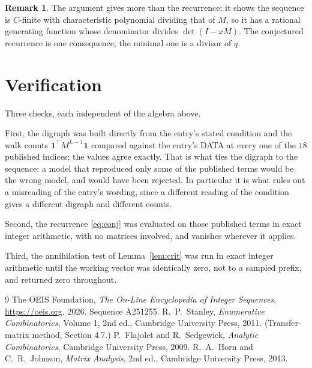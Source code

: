 \documentclass[11pt,a4paper]{article}
\theoremstyle{plain}
\theoremstyle{definition}
\newtheorem{remark}[theorem]{Remark}
\begin{document}
\begin{remark}
The argument gives more than the recurrence: it shows the sequence is $C$-finite with
characteristic polynomial dividing that of $M$, so it has a rational generating function
whose denominator divides $\det(I-xM)$. The conjectured recurrence is one consequence; the
minimal one is a divisor of $q$.
\end{remark}

\section{Verification}

Three checks, each independent of the algebra above.

First, the digraph was built directly from the entry's stated condition and the walk counts
$\mathbf{1}^{\!\top}M^{L-1}\mathbf{1}$ compared against the entry's DATA at
every one of the $18$ published indices; the values agree exactly. That is what ties
the digraph to the sequence: a model that reproduced only some of the published terms would
be the wrong model, and would have been rejected. In particular it is what rules out a
misreading of the entry's wording, since a different reading of the condition gives a
different digraph and different counts.

Second, the recurrence \eqref{eq:conj} was evaluated on those published terms in exact
integer arithmetic, with no matrices involved, and vanishes wherever it applies.

Third, the annihilation test of Lemma~\ref{lem:crit} was run in exact integer arithmetic
until the working vector was identically zero, not to a sampled prefix, and returned zero
throughout.

\begin{thebibliography}{9}
 The OEIS Foundation, \emph{The On-Line Encyclopedia of Integer
Sequences}, \url{https://oeis.org}, 2026. Sequence A251255.
 R.~P.~Stanley, \emph{Enumerative Combinatorics}, Volume 1, 2nd ed.,
Cambridge University Press, 2011. (Transfer-matrix method, Section 4.7.)
 P.~Flajolet and R.~Sedgewick, \emph{Analytic Combinatorics}, Cambridge
University Press, 2009.
 R.~A.~Horn and C.~R.~Johnson, \emph{Matrix Analysis}, 2nd ed., Cambridge
University Press, 2013.
\end{thebibliography}
\end{document}
